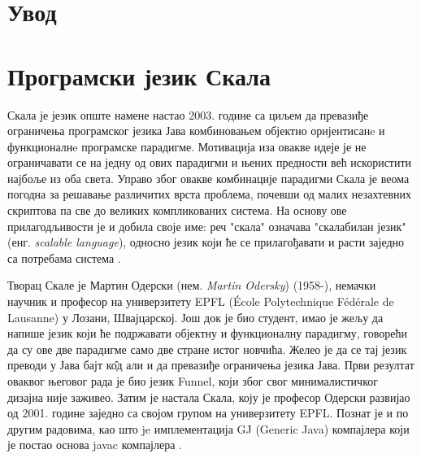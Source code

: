 \documentclass[12pt,oneside]{memoir}
\begin{document}
\frontmatter
\naslovna
\komisija
\apstrakt
\tableofcontents*

\mainmatter

\chapter{Увод}

\chapter{Програмски језик Скала}
\label{chp:razrada}

Скала је језик опште намене настао 2003. године са циљем да превазиђе ограничења програмског језика Јава комбиновањем објектно оријентисанe и функционалнe програмске парадигме. Мотивација иза овакве идеје је не ограничавати се на једну од ових парадигми и њених предности већ искористити најбоље из оба света. Управо због овакве комбинације парадигми Скала је веома погодна за решавање различитих врста проблема, почевши од малих незахтевних скриптова па све до великих компликованих система. На основу ове прилагодљивости је и добила своје име: реч "скала" означава "скалабилан језик" (енг. \textit{scalable language}), односно језик који ће се прилагођавати и расти заједно са потребама система \cite{progInScala}.
\par Творац Скале је Мартин Одерски (нем. \textit{Martin Odersky}) (1958-), немачки научник и професор на универзитету EPFL (École Polytechnique Fédérale de Lausanne) у Лозани, Швајцарској. Још док је био студент, имао је жељу да напише језик који ће подржавати објектну и функционалну парадигму, говорећи да су ове две парадигме само две стране истог новчића. Желео је да се тај језик преводи у Јава бајт к\^{о}д али и да превазиђе ограничења језика Јава. Први резултат оваквог његовог рада је био језик Funnel, који због свог минималистичког дизајна није заживео. Затим је настала Скала, коју је професор Одерски	 развијао од 2001. године заједно са својом групом на универзитету EPFL. Познат је и по другим радовима, као што je имплементација GJ (Generic Java) компајлера који је постао основа javac компајлера \cite{MartinEpfl, ScalaHistory}.
\end{document}
